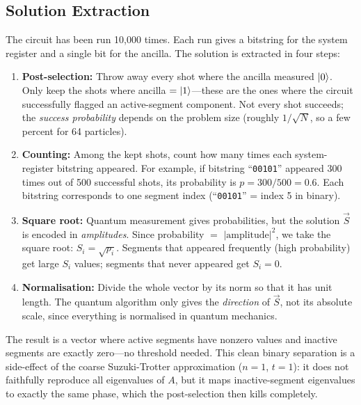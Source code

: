 \documentclass[11pt, a4paper]{article}
\begin{document}
\subsection{Solution Extraction}

The circuit has been run 10,000 times. Each run gives a bitstring for the
system register and a single bit for the ancilla. The solution is
extracted in four steps:

\begin{enumerate}
    \item \textbf{Post-selection:} Throw away every shot where the ancilla
          measured $\ket{0}$. Only keep the shots where ancilla $=
          \ket{1}$---these are the ones where the circuit successfully
          flagged an active-segment component. Not every shot succeeds; the
          \emph{success probability} depends on the problem size (roughly
          $1/\sqrt{N}$, so a few percent for 64 particles).

    \item \textbf{Counting:} Among the kept shots, count how many times
          each system-register bitstring appeared. For example, if
          bitstring ``\texttt{00101}'' appeared 300 times out of 500
          successful shots, its probability is $p = 300/500 = 0.6$. Each
          bitstring corresponds to one segment index (``\texttt{00101}'' =
          index 5 in binary).

    \item \textbf{Square root:} Quantum measurement gives probabilities,
          but the solution $\vec{S}$ is encoded in \emph{amplitudes}. Since
          probability $=$ $|\text{amplitude}|^2$, we take the square root:
          $S_i = \sqrt{p_i}$. Segments that appeared frequently (high
          probability) get large $S_i$ values; segments that never appeared
          get $S_i = 0$.

    \item \textbf{Normalisation:} Divide the whole vector by its norm so
          that it has unit length. The quantum algorithm only gives the
          \emph{direction} of $\vec{S}$, not its absolute scale, since
          everything is normalised in quantum mechanics.
\end{enumerate}

The result is a vector where active segments have nonzero values and
inactive segments are exactly zero---no threshold needed. This clean
binary separation is a side-effect of the coarse Suzuki-Trotter
approximation ($n=1$, $t=1$): it does not faithfully reproduce all
eigenvalues of $A$, but it maps inactive-segment eigenvalues to exactly
the same phase, which the post-selection then kills completely.
\end{document}
